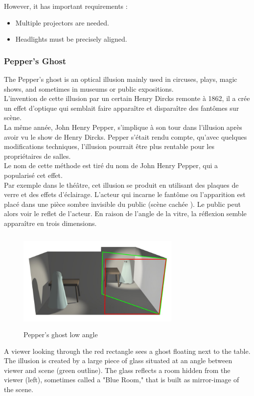 However, it has important requirements : 
\begin{itemize}
\item Multiple projectors are needed.
\item Headlights must be precisely aligned.
\end{itemize}


\subsubsection{Pepper's Ghost}
The Pepper's ghost is an optical illusion mainly used in circuses, plays, magic shows, and sometimes in museums or public expositions. \\
L'invention de cette illusion par un certain Henry Dircks remonte à 1862, il a crée un effet d'optique qui semblait faire apparaître et disparaître des fantômes sur scène.\\
La même année, John Henry Pepper, s'implique à son tour dans l'illusion après avoir vu le show de Henry Dircks. Pepper s'était rendu compte, qu'avec quelques modifications techniques, l'illusion pourrait être plus rentable pour les propriétaires de salles.\\
Le nom de cette méthode est tiré du nom de John Henry Pepper, qui a popularisé cet effet.\\
Par exemple dans le théâtre, cet illusion se produit en utilisant des plaques de verre et des effets d’éclairage. L'acteur qui incarne le fantôme ou l’apparition est placé dans une pièce sombre invisible du public (scène cachée ).
Le public peut alors voir le reflet de l'acteur. En raison de l'angle de la vitre, la réflexion semble apparaître en trois dimensions. 

\begin{figure}[h!]
\centering\includegraphics[width=8cm,height=5cm]{image/Peppers1.jpg}
\caption{Pepper's ghost low angle\cite{Peppers-ghost}}
\label{fig:paraba}
\end{figure}
A viewer looking through the red rectangle sees a ghost floating next to the table. The illusion is created by a large piece of glass situated at an angle between viewer and scene (green outline). The glass reflects a room hidden from the viewer (left), sometimes called a "Blue Room," that is built as mirror-image of the scene.\cite{Peppers-ghost}

